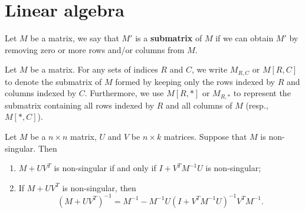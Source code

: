 \section{Linear algebra}
\label{sec:linear_algebra}

\begin{definition}[Fields]
\label{def:fields}
\end{definition}

\begin{definition}[Submatrix]
    Let \(M\) be a matrix, we say that \(M'\) is a \textbf{submatrix} of \(M\) if we can obtain \(M'\) by removing zero or more rows and/or columns from \(M\).
\end{definition}
\noindent
Let \(M\) be a matrix. 
For any sets of indices \(R\) and \(C\), we write \(M_{R,C}\) or \(M[R,C]\) to denote the submatrix of \(M\) formed by keeping only the rows indexed by \(R\) and columns indexed by \(C\). 
Furthermore, we use \(M[R,*]\) or \(M_{R, *}\) to represent the submatrix containing all rows indexed by \(R\) and all columns of \(M\) (resp., \(M[*, C]\)).
% 

\begin{theorem}
    Let \(M\) be a \(n \times n\) matrix, \(U\) and \(V\) be \(n \times k\) matrices.
    Suppose that \(M\) is non-singular. 
    Then
    \begin{enumerate}[label = (\arabic*)]
        \item \(M + UV^T\) is non-singular if and only if \(I + V^TM^{-1}U\) is non-singular;
        \item If \(M + UV^T\) is non-singular, then
        \[
            (M + UV^T)^{-1} = M^{-1} - M^{-1}U(I + V^TM^{-1}U)^{-1}V^TM^{-1}.
        \]
    \end{enumerate}
\end{theorem}

